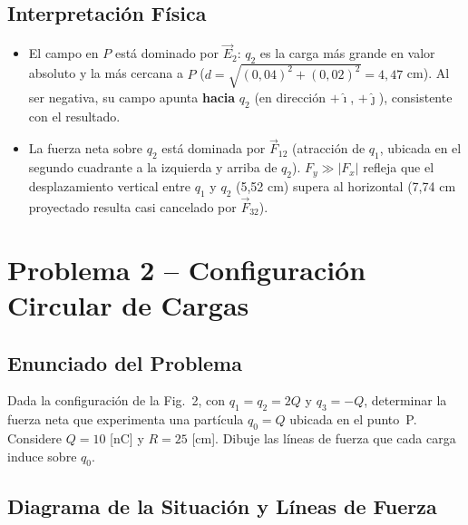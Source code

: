 \documentclass[12pt,letterpaper]{article}
\begin{document}
\subsection*{Interpretaci\'on F\'isica}

\begin{itemize}
    \item El campo en $P$ est\'a dominado por $\vec{E}_2$: $q_2$ es la carga m\'as grande en
          valor absoluto y la m\'as cercana a $P$ ($d = \sqrt{(0{,}04)^2+(0{,}02)^2} = 4{,}47$ cm).
          Al ser negativa, su campo apunta \textbf{hacia} $q_2$ (en direcci\'on $+\hat{\imath}$,
          $+\hat{\jmath}$), consistente con el resultado.
    \item La fuerza neta sobre $q_2$ est\'a dominada por $\vec{F}_{12}$ (atracci\'on de $q_1$,
          ubicada en el segundo cuadrante a la izquierda y arriba de $q_2$). $F_y \gg |F_x|$
          refleja que el desplazamiento vertical entre $q_1$ y $q_2$ (5{,}52 cm) supera al
          horizontal (7{,}74 cm proyectado resulta casi cancelado por $\vec{F}_{32}$).
\end{itemize}

\newpage
\section*{\textcolor{ubbblue}{Problema 2 \;--\; Configuraci\'on Circular de Cargas}}

\subsection*{Enunciado del Problema}

Dada la configuraci\'on de la Fig.~2, con $q_1=q_2=2Q$ y $q_3=-Q$, determinar la fuerza neta
que experimenta una part\'icula $q_0=Q$ ubicada en el punto~P. Considere $Q=10$ [nC] y $R=25$ [cm].
Dibuje las l\'ineas de fuerza que cada carga induce sobre $q_0$.

\subsection*{Diagrama de la Situaci\'on y L\'ineas de Fuerza}
\end{document}
